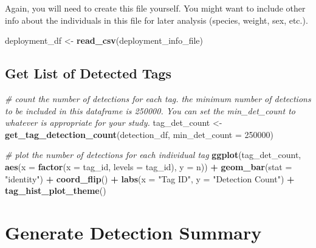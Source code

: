 \documentclass[
]{book}
\newenvironment{Shaded}{\begin{snugshade}}{\end{snugshade}}
\newcommand{\AttributeTok}[1]{\textcolor[rgb]{0.13,0.29,0.53}{#1}}
\newcommand{\CommentTok}[1]{\textcolor[rgb]{0.56,0.35,0.01}{\textit{#1}}}
\newcommand{\DecValTok}[1]{\textcolor[rgb]{0.00,0.00,0.81}{#1}}
\newcommand{\FunctionTok}[1]{\textcolor[rgb]{0.13,0.29,0.53}{\textbf{#1}}}
\newcommand{\NormalTok}[1]{#1}
\newcommand{\OtherTok}[1]{\textcolor[rgb]{0.56,0.35,0.01}{#1}}
\newcommand{\SpecialCharTok}[1]{\textcolor[rgb]{0.81,0.36,0.00}{\textbf{#1}}}
\newcommand{\StringTok}[1]{\textcolor[rgb]{0.31,0.60,0.02}{#1}}
\begin{document}
Again, you will need to create this file yourself. You might want to include other info about the individuals in this file for later analysis (species, weight, sex, etc.).

\begin{Shaded}
\begin{Highlighting}[]
\NormalTok{deployment\_df }\OtherTok{\textless{}{-}} \FunctionTok{read\_csv}\NormalTok{(deployment\_info\_file)}
\end{Highlighting}
\end{Shaded}

\subsection{Get List of Detected Tags}\label{get-list-of-detected-tags}

\begin{Shaded}
\begin{Highlighting}[]
\CommentTok{\# count the number of detections for each tag. the minimum number of detections to be included in this dataframe is 250000. You can set the \textasciigrave{}min\_det\_count\textasciigrave{} to whatever is appropriate for your study.}
\NormalTok{tag\_det\_count }\OtherTok{\textless{}{-}} \FunctionTok{get\_tag\_detection\_count}\NormalTok{(detection\_df, }\AttributeTok{min\_det\_count =} \DecValTok{250000}\NormalTok{)}

\CommentTok{\# plot the number of detections for each individual tag}
\FunctionTok{ggplot}\NormalTok{(tag\_det\_count, }
       \FunctionTok{aes}\NormalTok{(}\AttributeTok{x =} \FunctionTok{factor}\NormalTok{(}\AttributeTok{x =}\NormalTok{ tag\_id,}
                      \AttributeTok{levels =}\NormalTok{ tag\_id), }
           \AttributeTok{y =}\NormalTok{ n)) }\SpecialCharTok{+}
  \FunctionTok{geom\_bar}\NormalTok{(}\AttributeTok{stat =} \StringTok{"identity"}\NormalTok{) }\SpecialCharTok{+}
  \FunctionTok{coord\_flip}\NormalTok{() }\SpecialCharTok{+}
  \FunctionTok{labs}\NormalTok{(}\AttributeTok{x =} \StringTok{"Tag ID"}\NormalTok{, }
       \AttributeTok{y =} \StringTok{"Detection Count"}\NormalTok{) }\SpecialCharTok{+}
  \FunctionTok{tag\_hist\_plot\_theme}\NormalTok{()}
\end{Highlighting}
\end{Shaded}

\section{Generate Detection Summary}\label{generate-detection-summary}
\end{document}
